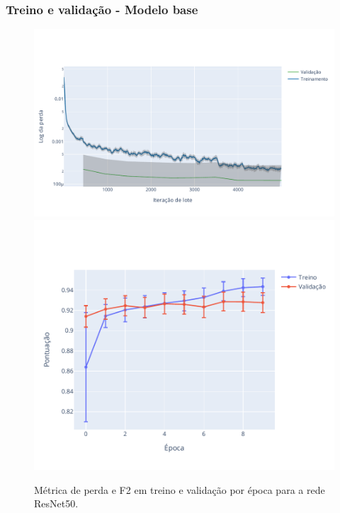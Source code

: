 \documentclass[8pt]{beamer}
\begin{document}
\begin{frame}
\frametitle{Treino e validação - Modelo base}


\begin{figure}[!ht]
    \centering
    \includegraphics[width=0.55\columnwidth]{Imagens/results/rsp-resnet-50_planet_pt/Training Loss Per Minibatch.pdf}
    \label{fig:TreinoResnetPerda}
    \centering
    \includegraphics[width=0.40\columnwidth]{Imagens/results/rsp-resnet-50_planet_pt/Pontuação em treino e validação por época.pdf}
    \caption{ Métrica de perda e F2 em treino e validação por época para a rede ResNet50.}
    \label{fig:TreinoResnetScore}
\end{figure}  

\end{frame}
\end{document}

